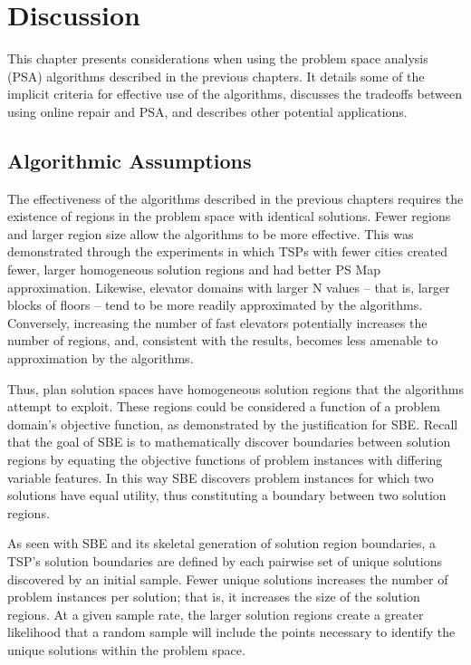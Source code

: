 \chapter{Discussion}
\thispagestyle{plain}

\label{ch:application}

This chapter presents considerations when using the problem space analysis  (PSA) algorithms described in the previous chapters.  It details some of the implicit criteria  for effective use of the algorithms, discusses the tradeoffs between using online repair and PSA, and describes other potential applications.

\section{Algorithmic Assumptions}



The effectiveness of the algorithms described in the previous chapters requires the existence of regions in the problem space with identical solutions.  Fewer regions and larger region size allow the algorithms to be more effective.  This was demonstrated through the experiments in which  TSPs with fewer cities created fewer, larger homogeneous solution regions and had better PS Map approximation.  Likewise, elevator domains with larger N values -- that is, larger blocks of floors -- tend to be more readily approximated by the algorithms.  Conversely, increasing the number of fast elevators potentially increases the number of regions, and, consistent with the results, becomes less amenable to approximation by the algorithms.

Thus, plan solution spaces have homogeneous solution regions that the algorithms attempt to exploit.  These regions could be considered a function of a problem domain's objective function, as demonstrated by the justification for SBE.  Recall that the goal of SBE is to mathematically discover boundaries between solution regions by equating the objective functions of problem instances with differing variable features.  In this way SBE discovers problem instances for which two solutions have equal utility, thus constituting a boundary between two solution regions.  

As  seen with SBE and its skeletal generation of solution region boundaries, a TSP's solution boundaries are defined by each pairwise set of unique solutions discovered by an initial sample.  Fewer unique solutions increases the number of problem instances per solution; that is, it increases the size of the solution regions.  At a given sample rate, the larger solution regions create a greater likelihood that  a random sample will include the points necessary to identify the unique solutions within the problem space.

